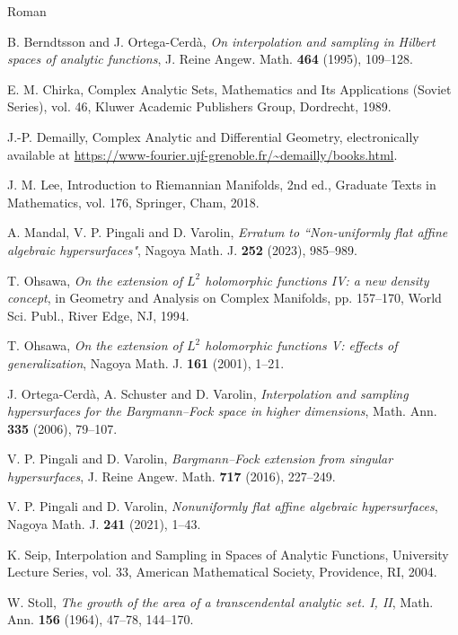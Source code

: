 \documentclass[12pt,a4paper]{amsart}
\numberwithin{equation}{section}
\theoremstyle{definition}
\begin{document}
\begin{thebibliography}{\;\;\; Roman}

 B. Berndtsson and J. Ortega-Cerd\`{a}, {\it On interpolation and sampling in Hilbert spaces of analytic functions}, J. Reine Angew. Math. {\bf 464} (1995), 109--128.

  E. M. Chirka, Complex Analytic Sets, Mathematics and Its Applications (Soviet Series), vol. 46, Kluwer Academic Publishers Group, Dordrecht, 1989.

 J.-P. Demailly, Complex Analytic and Differential Geometry, electronically available  at \url{https://www-fourier.ujf-grenoble.fr/~demailly/books.html}.

  J. M. Lee, Introduction to Riemannian Manifolds, 2nd ed., Graduate Texts in Mathematics, vol. 176, Springer, Cham, 2018.


  A. Mandal,  V. P. Pingali and D. Varolin, {\it Erratum to ``Non-uniformly flat affine algebraic hypersurfaces"}, Nagoya Math. J. {\bf 252} (2023), 985--989.

 T. Ohsawa, {\it On the extension of $L^2$ holomorphic functions IV: a new density concept}, in Geometry and Analysis on Complex Manifolds, pp. 157--170, World Sci. Publ., River Edge, NJ, 1994.

 T. Ohsawa, {\it On the extension of $L^2$ holomorphic functions V: effects of generalization}, Nagoya Math. J. {\bf 161} (2001), 1--21.

 J. Ortega-Cerd\`{a}, A. Schuster and D. Varolin, {\it Interpolation and sampling hypersurfaces for the Bargmann--Fock space in higher dimensions}, Math. Ann. {\bf 335} (2006),  79--107.

 V. P. Pingali and D. Varolin, {\it Bargmann--Fock extension from singular hypersurfaces}, J. Reine Angew. Math. {\bf 717} (2016), 227--249.

 V. P. Pingali and D. Varolin, {\it Nonuniformly flat affine algebraic hypersurfaces}, Nagoya Math. J. {\bf 241} (2021), 1--43.


 K. Seip, Interpolation and Sampling in Spaces of Analytic Functions, University Lecture Series, vol. 33, American Mathematical Society, Providence, RI, 2004.

 W. Stoll, {\it The growth of the area of a transcendental analytic set. I, II}, Math. Ann. {\bf 156} (1964), 47--78, 144--170.

\end{thebibliography}
\end{document}
